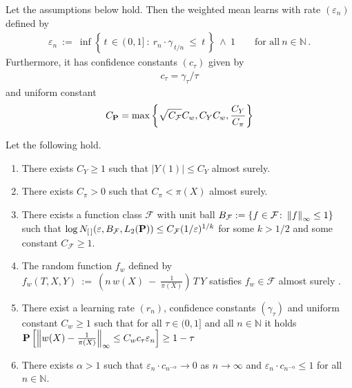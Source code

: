 \begin{theorem*}
  Let the assumptions below hold.
  Then the weighted mean learns with rate
  $
    (\varepsilon_n)
  $
  defined by
  \begin{gather*}
    \varepsilon_n
    \ 
    :=
    \ 
    \inf
    \left\{ \,t \,\in\,  (\,0,1]
      \ 
      \colon
      \ 
  r_n \cdot \gamma_{\,t/n}
  \ 
  \le
  \ 
  t
  \,
    \right\}
    \ 
    \land 
    \ 
    1
    \qquad
    \text{for all}
    \ 
    n\in \mathbb{N}
    \,.
  \end{gather*}
  Furthermore, it has confidence constants
  $
  (c_\tau)
  $
  given by
\begin{gather}
  c_\tau = \gamma_\tau /\tau
\end{gather}
  and uniform constant
  \begin{gather}
C_\P    
=
\max
\left\{ 
  \sqrt{C_\mathcal{F}}
  C_w
  ,
  C_Y
  C_w
  ,
  \frac{C_Y}{C_\pi}
\right\}
  \end{gather}
\end{theorem*}
\begin{assumptions*}
  Let the following hold.
  \begin{enumerate}[label={(\roman*)}]
    \item
      There exists $C_Y\ge 1$ such that $|Y(1)|\le C_Y$ almost surely. 
    \item
      There exists $C_\pi > 0$ such that $C_\pi < \pi(X)$ almost surely.
    \item
      There exists a function class $\mathcal{F}$ 
      with unit ball 
      $
        B_\mathcal{F}
        :=
        \left\{ 
          f\in \mathcal{F}
          \colon
          \norm{f}_\infty
          \le 
          1
        \right\}
      $
      such that  
      $
          \log N_{[\,]}(\varepsilon, B_\mathcal{F}, L_2(\P))
        \le
        C_{\mathcal{F}}
        (1/\varepsilon)^{1/k} 
      $
      for some $k>1/2$ and some constant $C_\mathcal{F}\ge 1$.
    \item
      The random function $f_w$ defined by
      $
  f_w(T,X,Y)
  \ 
  :=
  \ 
  \left( 
   n\, w(X)
    \ 
    -
    \ 
    \frac{1}{\pi(X)}
  \right)
  \,
  T
  \,
  Y
      $
      satisfies
      $f_w\in \mathcal{F}$
      almost surely
      .
  \item 
    There exist a learning rate 
    $
    (r_n)
    $,
    confidence constants
    $
    (\gamma_\tau)
    $
    and 
    uniform constant
    $
    C_w\ge 1
    $
    such that
    for all $\tau \in(0,1]$
    and all $n \in \mathbb{N}$
    it holds
    $
    \P
    \left[ 
    \norm{w(X) - \frac{1}{\pi(X)}}_\infty
    \le
    C_w
    c_\tau
    \varepsilon_n
    \right]
    \ge 
    1-\tau
    $
    \item
      There exists $\alpha > 1$ 
  such that 
  $
  \varepsilon_n \cdot c_{n^{-\alpha}}
  \to 
  0
  $
  as 
  $
  n\to \infty
  $
  and 
  $
  \varepsilon_n \cdot c_{n^{-\alpha}}
  \le 
  1
  $
  for all 
  $n \in \mathbb{N}$.
  \end{enumerate}
\end{assumptions*}
